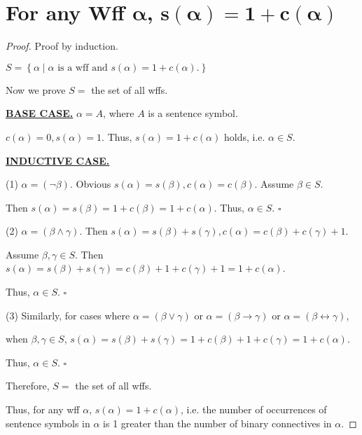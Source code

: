 \documentclass{article}
\newcommand{\set}[1]{\left\{#1\right\}}
\newcommand{\whiteqed}{\hfill $\square$\par}
\begin{document}
\section{For any Wff $\boldsymbol{\alpha}$, $\boldsymbol{s(\alpha) = 1+c(\alpha)}$}
\vspace{1em}
\begin{proof}
    Proof by induction.

    \hspace{1.3em}
    $S=\set{\alpha\mid\alpha\text{ is a wff and $s(\alpha)=1+c(\alpha)$.}}$

    \hspace{1.3em}
    Now we prove $S=$ the set of all wffs.

    \hspace{1.3em}
    \underline{\textbf{BASE CASE.}} $\alpha=A$, where $A$ is a sentence symbol. 
    
    \hspace{1.3em}
    $c(\alpha)=0, s(\alpha)=1.$ Thus, $s(\alpha)=1+c(\alpha)$ holds, i.e. $\alpha\in S$.

    \hspace{1.3em}
    \underline{\textbf{INDUCTIVE CASE.}}

    \hspace{1.3em}
    (1) $\alpha=(\neg\beta)$. Obvious $s(\alpha)=s(\beta), c(\alpha)=c(\beta)$. Assume $\beta\in S$.

    \hspace{7.7em}
    Then $s(\alpha)=s(\beta)=1+c(\beta)=1+c(\alpha)$. Thus, $\alpha\in S$. \whiteqed

    \hspace{1.3em}
    (2) $\alpha=(\beta\land\gamma)$. Then $s(\alpha)=s(\beta)+s(\gamma), c(\alpha)=c(\beta)+c(\gamma)+1$.

    \hspace{8.8em}
    Assume $\beta,\gamma\in S$.
    Then $s(\alpha)=s(\beta)+s(\gamma)=c(\beta)+1+c(\gamma)+1=1+c(\alpha)$.

    \hspace{8.8em}
    Thus, $\alpha\in S$. \whiteqed

    \hspace{1.3em}
    (3) Similarly, for cases where $\alpha=(\beta\lor\gamma)$ or $\alpha=(\beta\to\gamma)$ or $\alpha=(\beta\leftrightarrow\gamma)$, 

    \hspace{2.9em}
    when $\beta,\gamma\in S$, $s(\alpha)=s(\beta)+s(\gamma)=1+c(\beta)+1+c(\gamma)=1+c(\alpha)$.

    \hspace{2.9em}
    Thus, $\alpha\in S$. \whiteqed

    \vspace{1em} \hspace{1.3em}
    Therefore, $S=$ the set of all wffs.

    \hspace{1.3em}
    Thus, for any wff $\alpha$, $s(\alpha)=1+c(\alpha)$, i.e. the number of occurrences of sentence symbols in $\alpha$ is 1 greater than the number of binary connectives in $\alpha$.
\end{proof}
\end{document}
